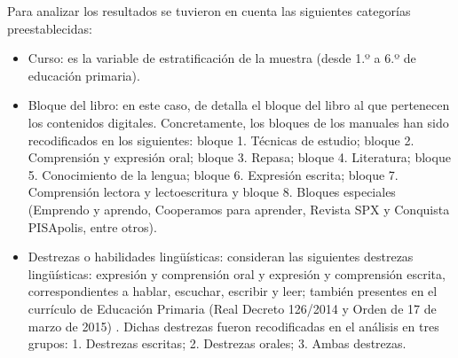 \documentclass[spanish]{textolivre}
\begin{document}
Para analizar los resultados se tuvieron en cuenta las siguientes categorías preestablecidas:  

\begin{itemize}
    \item Curso: es la variable de estratificación de la muestra (desde 1.º a 6.º de educación primaria).
    \item Bloque del libro: en este caso, de detalla el bloque del libro al que pertenecen los contenidos digitales. Concretamente, los bloques de los manuales han sido recodificados en los siguientes: bloque 1. Técnicas de estudio; bloque 2. Comprensión y expresión oral; bloque 3. Repasa; bloque 4. Literatura; bloque 5. Conocimiento de la lengua; bloque 6. Expresión escrita; bloque 7. Comprensión lectora y lectoescritura y bloque 8. Bloques especiales (Emprendo y aprendo, Cooperamos para aprender, Revista SPX y Conquista PISApolis, entre otros). 
    \item Destrezas o habilidades lingüísticas: \textcite{cassany_ensenar_1994} consideran las siguientes destrezas lingüísticas: expresión y comprensión oral y expresión y comprensión escrita, correspondientes a hablar, escuchar, escribir y leer; también presentes en el currículo de Educación Primaria (Real Decreto 126/2014 y Orden de 17 de marzo de 2015) \cite{ministerio_de_educacion_y_ciencia_real_2014, junta_de_andalucia_orden_2015}. Dichas destrezas fueron recodificadas en el análisis en tres grupos: 1. Destrezas escritas; 2. Destrezas orales; 3. Ambas destrezas.

\end{itemize}
\end{document}

